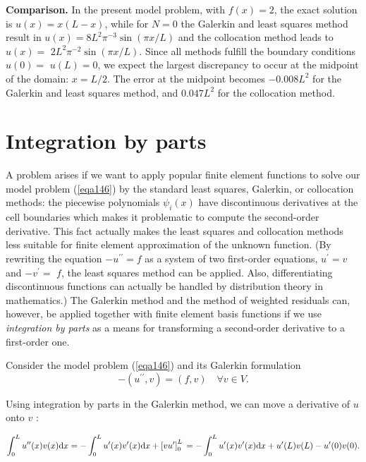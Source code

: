 \documentclass[../main.tex]{subfiles}
\begin{document}
	\noindent \textbf{Comparison.} In the present model problem, with $f(x)=2$, the exact solution is $u(x)=x(L-x)$, while for $N=0$ the Galerkin and least squares method result in $u(x)=8 L^{2} \pi^{-3} \sin (\pi x / L)$ and the collocation method leads to $u(x)=$ $2 L^{2} \pi^{-2} \sin (\pi x / L)$. Since all methods fulfill the boundary conditions $u(0)=$ $u(L)=0$, we expect the largest discrepancy to occur at the midpoint of the domain: $x=L / 2$. The error at the midpoint becomes $-0.008 L^{2}$ for the Galerkin and least squares method, and $0.047 L^{2}$ for the collocation method. \bigbreak 

\section[Integration by parts]{Integration by parts} 
	\label{sec:sec_11_10}
	\noindent A problem arises if we want to apply popular finite element functions to solve our model problem (\ref{eqa146}) by the standard least squares, Galerkin, or collocation methods: the piecewise polynomials $\psi_{i}(x)$ have discontinuous derivatives at the cell boundaries which makes it problematic to compute the second-order derivative. This fact actually makes the least squares and collocation methods less suitable for finite element approximation of the unknown function. (By rewriting the equation $-u^{\prime \prime}=f$ as a system of two first-order equations, $u^{\prime}=v$ and $-v^{\prime}=$ $f$, the least squares method can be applied. Also, differentiating discontinuous functions can actually be handled by distribution theory in mathematics.) The Galerkin method and the method of weighted residuals can, however, be applied together with finite element basis functions if we use \emph{integration by parts} as a means for transforming a second-order derivative to a first-order one.
	
	Consider the model problem (\ref{eqa146}) and its Galerkin formulation
	$$ -\left(u^{\prime \prime}, v\right)=(f, v) \quad \forall v \in V . $$
	
	\noindent Using integration by parts in the Galerkin method, we can move a derivative of $u$ onto $v$ :
	
	\begin{equation}
		\label{eqa161}
		\int_{0}^{L} u^{\prime \prime}(x) v(x) \mathrm{d} x =-\int_{0}^{L} u^{\prime}(x) v^{\prime}(x) \mathrm{d} x+\left[v u^{\prime}\right]_{0}^{L} \\
		=-\int_{0}^{L} u^{\prime}(x) v^{\prime}(x) \mathrm{d} x+u^{\prime}(L) v(L)-u^{\prime}(0) v(0) .
	\end{equation}
	
\end{document}
